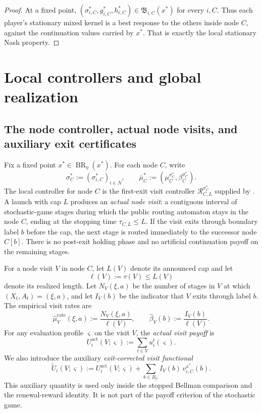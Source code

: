 \documentclass[12pt]{article}
\theoremstyle{definition}
\newcommand{\1}{\mathbf{1}}
\DeclareMathOperator{\BR}{BR}
\begin{document}
\begin{proof}
At a fixed point,
$(\sigma_{i,C}^*,g_{i,C}^*,h_{i,C}^*)\in\mathfrak B_{i,C}(x^*)$ for every $i,C$.
Thus each player's stationary mixed kernel is a best response to the others inside
node $C$, against the continuation values carried by $x^*$. That is exactly the
local stationary Nash property.
\end{proof}


\section{Local controllers and global realization}
\label{sec:realization}

\subsection{The node controller, actual node visits, and auxiliary exit certificates}

Fix a fixed point $x^*\in\BR_\eta(x^*)$. For each node $C$, write
\[
\sigma_C^*:=(\sigma_{i,C}^*)_{i\in N},
\qquad
\bar\mu_C^*:=(\mu_C^{\sigma_C^*},\beta_C^{\sigma_C^*}).
\]
The local controller for node $C$ is the first-exit visit controller
$\mathcal R_{C,L}^{\sigma_C^*}$ supplied by . A
launch with cap $L$ produces an \emph{actual node visit}: a contiguous interval
of stochastic-game stages during which the public routing automaton stays in the
node $C$, ending at the stopping time $\tau_{C,L}\le L$. If the visit exits
through boundary label $b$ before the cap, the next stage is routed immediately
to the successor node $C[b]$. There is no post-exit holding phase and no
artificial continuation payoff on the remaining stages.

For a node visit $V$ in node $C$, let $L(V)$ denote its announced cap and let
\[
\ell(V):=\tau(V)\le L(V)
\]
denote its realized length. Let $N_V(\xi,a)$ be the number of stages in $V$ at
which $(X_t,A_t)=(\xi,a)$, and let $I_V(b)$ be the indicator that $V$ exits
through label $b$. The empirical visit rates are
\[
\widehat\mu_V^{\mathrm{rate}}(\xi,a):=\frac{N_V(\xi,a)}{\ell(V)},
\qquad
\widehat\beta_V(b):=\frac{I_V(b)}{\ell(V)}.
\]
For any evaluation profile $\varsigma$ on the visit $V$, the \emph{actual visit
payoff} is
\begin{equation}
\label{eq:visit-actual-payoff}
U_i^{\mathrm{act}}(V;\varsigma)
:=
\sum_{t\in V} u_i^t(\varsigma).
\end{equation}
We also introduce the auxiliary \emph{exit-corrected visit functional}
\begin{equation}
\label{eq:visit-aux-payoff}
\widetilde U_i(V;\varsigma)
:=
U_i^{\mathrm{act}}(V;\varsigma)
+
\sum_{b\in B_C}I_V(b)\,v_{i,C}^{x^*}(b).
\end{equation}
This auxiliary quantity is used only inside the stopped Bellman comparison and
the renewal-reward identity. It is not part of the payoff criterion of the
stochastic game.
\end{document}
